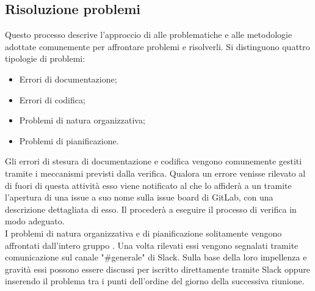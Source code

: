 \subsection{Risoluzione problemi}\label{subsection:risoluzione_problemi}
Questo processo descrive l'approccio di \groupName{} alle problematiche e alle metodologie adottate comunemente per affrontare problemi e risolverli. Si distinguono quattro tipologie di problemi:
\begin{itemize}
	\item Errori di documentazione;
	\item Errori di codifica;
	\item Problemi di natura organizzativa;
	\item Problemi di pianificazione.	
\end{itemize}
Gli errori di stesura di documentazione e codifica vengono comunemente gestiti tramite i meccanismi previsti dalla verifica. Qualora un errore venisse rilevato al di fuori di questa attività esso viene notificato al \roleProjectManager{} che lo affiderà a un \roleVerifier{} tramite l'apertura di una issue a suo nome sulla issue board di GitLab, con una descrizione dettagliata di esso. Il \roleVerifier{} procederà a eseguire il processo di verifica in modo adeguato.\\
I problemi di natura organizzativa e di pianificazione solitamente vengono affrontati dall'intero gruppo \groupName{}. Una volta rilevati essi vengono segnalati tramite comunicazione sul canale "\#generale" di Slack. Sulla base della loro impellenza e gravità essi possono essere discussi per iscritto direttamente tramite Slack oppure inserendo il problema tra i punti dell'ordine del giorno della successiva riunione.